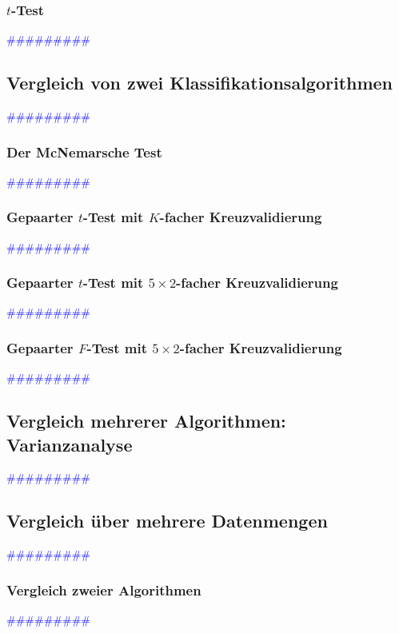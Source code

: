 \documentclass{article}
\begin{document}
    \subsubsection{$t$-Test} %
       \textcolor{blue}{\#\#\#\#\#\#\#\#\#}
  \subsection{Vergleich von zwei Klassifikationsalgorithmen} %
       \textcolor{blue}{\#\#\#\#\#\#\#\#\#}
    \subsubsection{Der McNemarsche Test} %
       \textcolor{blue}{\#\#\#\#\#\#\#\#\#}
    \subsubsection{Gepaarter $t$-Test mit $K$-facher Kreuzvalidierung} %
       \textcolor{blue}{\#\#\#\#\#\#\#\#\#}
    \subsubsection{Gepaarter $t$-Test mit $5 \times 2$-facher Kreuzvalidierung} %
       \textcolor{blue}{\#\#\#\#\#\#\#\#\#}
    \subsubsection{Gepaarter $F$-Test mit $5 \times 2$-facher Kreuzvalidierung} %
       \textcolor{blue}{\#\#\#\#\#\#\#\#\#}
  \subsection{Vergleich mehrerer Algorithmen: Varianzanalyse} %
       \textcolor{blue}{\#\#\#\#\#\#\#\#\#}
  \subsection{Vergleich über mehrere Datenmengen} %
       \textcolor{blue}{\#\#\#\#\#\#\#\#\#}
    \subsubsection{Vergleich zweier Algorithmen} %
       \textcolor{blue}{\#\#\#\#\#\#\#\#\#}
\end{document}
